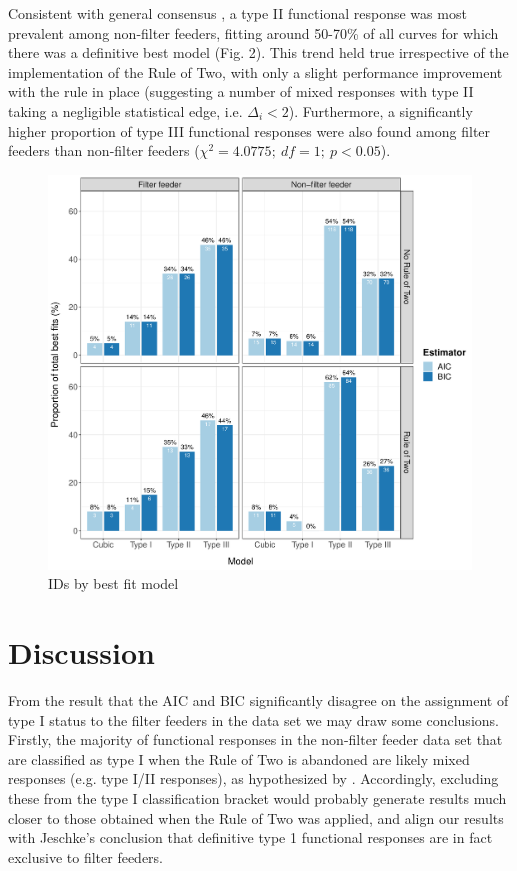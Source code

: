 \documentclass[11pt]{article}
\begin{document}
    Consistent with general consensus \citep{hassell1976components, begon1996ecology}, a type II functional response was most prevalent among non-filter feeders, fitting around 50-70\% of all curves for which there was a definitive best model (Fig. 2). This trend held true irrespective of the implementation of the Rule of Two, with only a slight performance improvement with the rule in place (suggesting a number of mixed responses with type II taking a negligible statistical edge, i.e. $\Delta_i<2$). 
    Furthermore, a significantly higher proportion of type III functional responses were also found among filter feeders than non-filter feeders ($\chi^2=4.0775;\:df=1;\:p<0.05$). 
    
        
    \begin{figure}[t!]
	    \centering\includegraphics[width=1\textwidth]{ModelComparisonBar.pdf}
	    \caption{IDs by best fit model}
    \end{figure}

   
    
    \section{Discussion}

    From the result that the AIC and BIC significantly disagree on the assignment of type I status to the filter feeders in the data set we may draw some conclusions. Firstly, the majority of functional responses in the non-filter feeder data set that are classified as type I when the Rule of Two is abandoned are likely mixed responses (e.g. type I/II responses), as hypothesized by \citet[p.341]{jeschke2004consumer}. Accordingly, excluding these from the type I classification bracket would probably generate results much closer to those obtained when the Rule of Two was applied, and align our results with Jeschke's conclusion that definitive type 1 functional responses are in fact exclusive to filter feeders.
    
\end{document}
